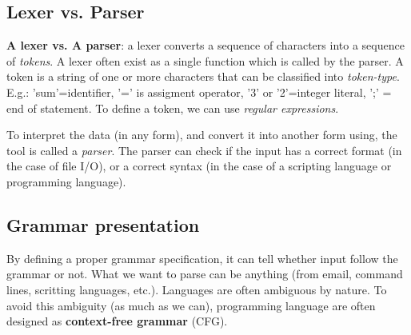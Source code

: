 \subsection{Lexer vs. Parser}

{\bf A lexer vs. A parser}: a lexer converts a sequence of characters into a
sequence of {\it tokens}. A lexer often exist as a single function which is
called by the parser. A token is a string of one or more characters that can be
classified into {\it token-type}. E.g.: 'sum'=identifier, '=' is assigment
operator, '3' or '2'=integer literal, ';' = end of statement. To define a token,
we can use {\it regular expressions}.

To interpret the data (in any form), and convert it into another form
using, the tool is called a {\it parser}. The parser can check if the input has
a correct format (in the case of file I/O), or a correct syntax (in the case of a
scripting language or programming language).


\subsection{Grammar presentation}

By defining a proper grammar specification, it can tell whether input follow the
grammar or not. What we want to parse can be anything (from email, command
lines, scritting languages, etc.). Languages are often ambiguous by nature. To
avoid this ambiguity (as much as we can), programming language are often
designed as {\bf context-free grammar} (CFG).

